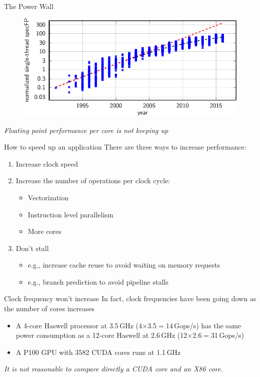 \documentclass[aspectratio=169,12pt]{beamer}
\begin{document}
\begin{frame}{The Power Wall}
  \begin{figure}
    \centering
    \includegraphics[width=.8\textwidth]{fp_perf}
  \end{figure}
   \vspace{-.5\baselineskip}\centering
   \emph{Floating point performance per core is not keeping up}
\end{frame}


\begin{frame}{How to speed up an application}
  There are three ways to increase performance:
  \vfill
  \begin{enumerate}
  \item Increase clock speed
  \item Increase the number of operations per clock cycle:
    \begin{itemize}
    \item Vectorization
    \item Instruction level parallelism
    \item More cores
    \end{itemize}
  \item Don't stall
    \begin{itemize}
    \item e.g., increase cache reuse to avoid waiting on memory requests
    \item e.g., branch prediction to avoid pipeline stalls
    \end{itemize}
  \end{enumerate}
\end{frame}

\begin{frame}{Clock frequency won't increase}
  In fact, clock frequencies have been going down as the number of cores increases
  \begin{itemize}
  \item A 4-core Haswell processor at 3.5\,GHz (4$\times$3.5$=$14\,Gops/s) has the same power consumption as a 12-core Haswell at 2.6\,GHz (12$\times$2.6$=$31\,Gops/s)
  \item A P100 GPU with 3582 CUDA cores runs at 1.1\,GHz
  \end{itemize}
  \vfill
  \emph{It is not reasonable to compare directly a CUDA core and an X86 core.}
\end{frame}
\end{document}

